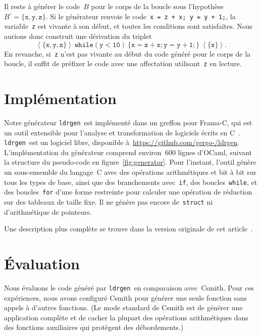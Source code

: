 \documentclass[a4paper]{easychair}
\newcommand\ldrgen{\texttt{ldrgen}}
\newcommand{\liveout}[1]{\ensuremath{#1^{\circ}}}
\newcommand{\triple}[3]{\ensuremath{
    \left\langle#1\right\rangle \ #2 \ \left\langle#3\right\rangle
}}
\begin{document}
Il reste à générer le code~\(B\) pour le corps de la boucle sous
l'hypothèse~\(\liveout{B} = \{\mathtt{x}, \mathtt{y}, \mathtt{z}\}\). Si le
générateur renvoie le code~\texttt{x = z + x; y = y + 1;}, la
variable~\texttt{z} est vivante à son début, et toutes les conditions sont
satisfaites. Nous aurions donc construit une dérivation du triplet
\[\triple{\{\mathtt{x}, \mathtt{y}, \mathtt{z}\}}{\mathtt{while (y <
10)\ \{ x = z + x; y = y + 1; \}}}{\{\mathtt{x}\}}.\]
En revanche, si~\texttt{z} n'est pas vivante au début du code généré pour le
corps de la boucle, il suffit de préfixer le code avec une affectation
utilisant~\texttt{z} en lecture.


\section{Implémentation}

Notre générateur \ldrgen\ est implémenté dans un greffon pour Frama-C, qui
est un outil extensible pour l'analyse et transformation de logiciels écrits
en C~\cite{frama-c}. \ldrgen\ est un logiciel libre, disponible
à~\url{https://github.com/gergo-/ldrgen}. L'implémentation du générateur
comprend environ~600 lignes d'OCaml, suivant la structure du pseudo-code en
figure~\ref{fig:generator}. Pour l'instant, l'outil génère un sous-ensemble
du langage~C avec des opérations arithmétiques et bit à bit sur tous les
types de base, ainsi que des branchements avec~\texttt{if}, des
boucles~\texttt{while}, et des boucles~\texttt{for} d'une forme restreinte
pour calculer une opération de réduction sur des tableaux de taille fixe. Il
ne génère pas encore de~\texttt{struct} ni d'arithmétique de pointeurs.


Une description plus complète se trouve dans la version originale de cet
article~\cite{ldrgen-2017}.


\section{Évaluation}

Nous évaluons le code généré par \ldrgen\ en comparaison avec~Csmith. Pour
ces expériences, nous avons configuré Csmith pour générer une seule
fonction sans appels à d'autres fonctions. (Le mode standard de Csmith est de
générer une application complète et de cacher la plupart des opérations
arithmétiques dans des fonctions auxiliaires qui protègent des
débordements.)
\end{document}
